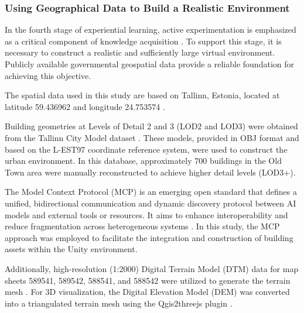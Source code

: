 \subsubsection{Using Geographical Data to Build a Realistic Environment}

In the fourth stage of experiential learning, active experimentation is emphasized as a critical component of knowledge acquisition \parencite{kolb1984}. To support this stage, it is necessary to construct a realistic and sufficiently large virtual environment. Publicly available governmental geospatial data provide a reliable foundation for achieving this objective.

The spatial data used in this study are based on Tallinn, Estonia, located at latitude 59.436962 and longitude 24.753574 \parencite{eslamirad_geoprocess_2023}.

Building geometries at Levels of Detail 2 and 3 (LOD2 and LOD3) were obtained from the Tallinn City Model dataset \parencite{TallinnCityModel2012}. These models, provided in OBJ format and based on the L-EST97 coordinate reference system, were used to construct the urban environment. In this database, approximately 700 buildings in the Old Town area were manually reconstructed to achieve higher detail levels (LOD3+).

The Model Context Protocol (MCP) is an emerging open standard that defines a unified, bidirectional communication and dynamic discovery protocol between AI models and external tools or resources. It aims to enhance interoperability and reduce fragmentation across heterogeneous systems \parencite{hou_model_2025}. In this study, the MCP approach was employed to facilitate the integration and construction of building assets within the Unity environment.

Additionally, high-resolution (1:2000) Digital Terrain Model (DTM) data for map sheets 589541, 589542, 588541, and 588542 were utilized to generate the terrain mesh \parencite{EstonianLandBoard2020}. For 3D visualization, the Digital Elevation Model (DEM) was converted into a triangulated terrain mesh using the Qgis2threejs plugin \parencite{Akagi2024}.

